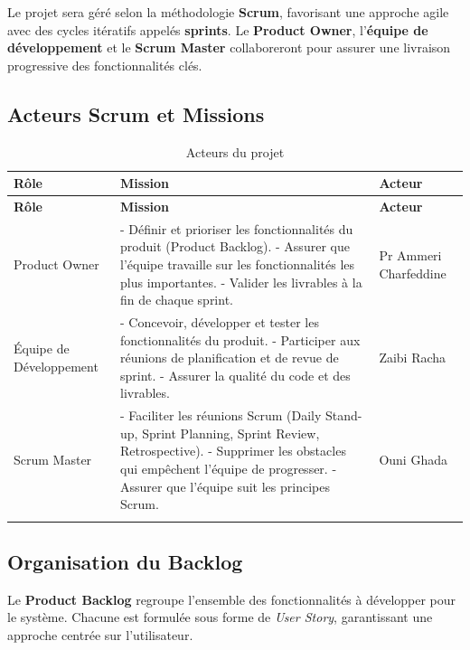 Le projet sera géré selon la méthodologie \textbf{Scrum}, favorisant une approche agile avec des cycles itératifs appelés \textbf{sprints}. Le \textbf{Product Owner}, l’\textbf{équipe de développement} et le \textbf{Scrum Master} collaboreront pour assurer une livraison progressive des fonctionnalités clés.

\subsection*{Acteurs Scrum et Missions}
\begin{longtable}{|m{3cm}|m{8cm}|m{2cm}|}
\hline
\textbf{Rôle} & \textbf{Mission} & \textbf{Acteur} \\
\hline
\endfirsthead
\hline
\textbf{Rôle} & \textbf{Mission} & \textbf{Acteur} \\
\hline
\endhead
\endfoot
Product Owner & 
- Définir et prioriser les fonctionnalités du produit (Product Backlog). \newline
- Assurer que l'équipe travaille sur les fonctionnalités les plus importantes. \newline
- Valider les livrables à la fin de chaque sprint. &
Pr Ammeri Charfeddine \\
\hline
Équipe de Développement & 
- Concevoir, développer et tester les fonctionnalités du produit. \newline
- Participer aux réunions de planification et de revue de sprint. \newline
- Assurer la qualité du code et des livrables. &
Zaibi Racha \\
\hline
Scrum Master & 
- Faciliter les réunions Scrum (Daily Stand-up, Sprint Planning, Sprint Review, Retrospective). \newline
- Supprimer les obstacles qui empêchent l'équipe de progresser. \newline
- Assurer que l'équipe suit les principes Scrum. &
Ouni Ghada\\
\hline
\caption{Acteurs du projet} 
\end{longtable}

\subsection*{Organisation du Backlog}
Le \textbf{Product Backlog} regroupe l’ensemble des fonctionnalités à développer pour le système. Chacune est formulée sous forme de \textit{User Story}, garantissant une approche centrée sur l’utilisateur.

